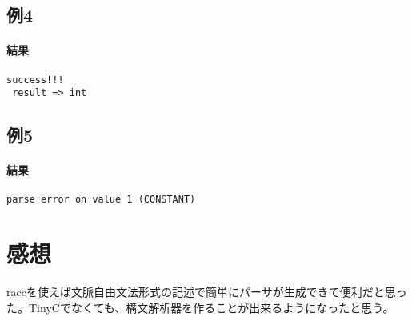 \documentclass[titlepage, a4paper,12pt]{jarticle}
\begin{document}
\subsection{例4}

\paragraph{結果}
\begin{verbatim}
success!!! 
 result => int
\end{verbatim}
\subsection{例5}

\paragraph{結果}
\begin{verbatim}
parse error on value 1 (CONSTANT)
\end{verbatim}
\section{感想}
raccを使えば文脈自由文法形式の記述で簡単にパーサが生成できて便利だと思った。TinyCでなくても、構文解析器を作ることが出来るようになったと思う。
\end{document}
